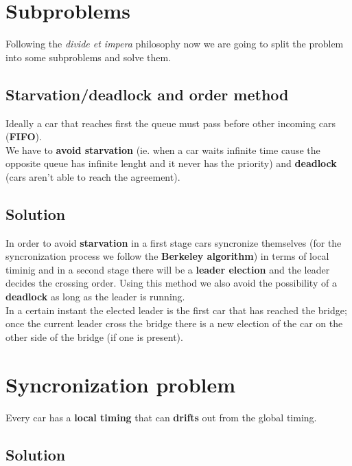 \section{Subproblems}

Following the \textit{divide et impera} philosophy now we are going to split the problem 
into some subproblems and solve them. 


\subsection{Starvation/deadlock and order method}

Ideally a car that reaches first the queue must pass before other 
incoming cars (\textbf{FIFO}).\\

We have to \textbf{avoid starvation} (ie. when a car waits infinite time cause the opposite queue 
has infinite lenght and it never has the priority) and \textbf{deadlock} (cars aren't able to 
reach the agreement). 


\subsection{Solution}

In order to avoid \textbf{starvation} in a first stage cars syncronize themselves 
(for the syncronization process we follow the \textbf{Berkeley algorithm})
in terms of local timinig and in a second stage there will be a \textbf{leader election} 
and the leader decides the crossing order. Using this method we also avoid 
the possibility of a \textbf{deadlock} as long as the leader is running.\\

In a certain instant the elected leader is the first car that has reached the bridge; 
once the current leader cross the bridge there is a new election of the car on the other 
side of the bridge (if one is present).\\


\section{Syncronization problem}

Every car has a \textbf{local timing} that can \textbf{drifts} out from the 
global timing. 

\subsection{Solution}

